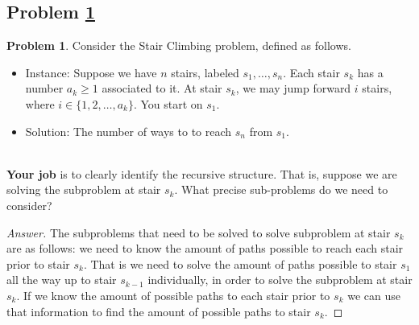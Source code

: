 \documentclass[11pt]{article}
\theoremstyle{definition}
\theoremstyle{definition}
\newtheorem{required}{Problem}
\theoremstyle{definition}
\begin{document}
\subsection{Problem \ref{DP1}}
\begin{required} \label{DP1}
Consider the \textsf{Stair Climbing} problem, defined as follows.
\begin{itemize}
\item \textsf{Instance:} Suppose we have $n$ stairs, labeled $s_{1}, \ldots, s_{n}$. Each stair $s_{k}$ has a number $a_{k} \geq 1$ associated to it. At stair $s_{k}$, we may jump forward $i$ stairs, where $i \in \{ 1, 2, \ldots, a_{k}\}$. You start on $s_{1}$.

\item \textsf{Solution:} The number of ways to to reach $s_{n}$ from $s_{1}$.
\end{itemize}

\noindent \\ \textbf{Your job} is to clearly identify the recursive structure. That is, suppose we are solving the subproblem at stair $s_{k}$. What precise sub-problems do we need to consider?
\end{required}

\begin{proof}[Answer]

The subproblems that need to be solved to solve subproblem at stair $s_k$ are as follows: we need to know the amount of paths possible to reach each stair prior to stair $s_k$. That is we need to solve the amount of paths possible to stair $s_1$ all the way up to stair $s_{k-1}$ individually, in order to solve the subproblem at stair $s_k$. If we know the amount of possible paths to each stair prior to $s_k$ we can use that information to find the amount of possible paths to stair $s_k$. 

\end{proof}



\newpage
\end{document}
